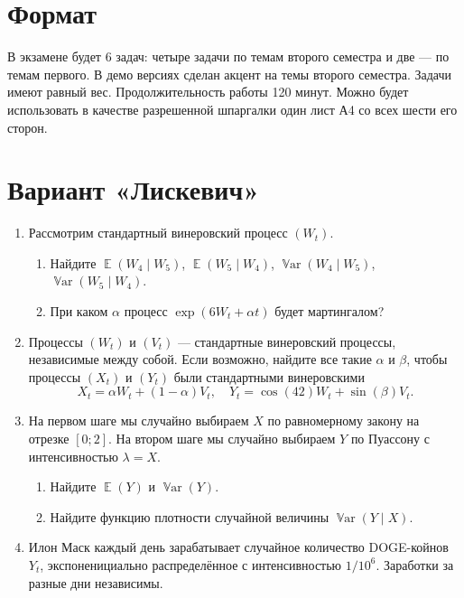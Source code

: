 \documentclass[12pt]{article}
\DeclareMathOperator{\Var}{\mathbb{V}ar}
\DeclareMathOperator{\E}{\mathbb{E}}
\begin{document}
\section*{Формат}

В экзамене будет 6 задач: четыре задачи по темам второго семестра и две — по темам первого. 
В демо версиях сделан акцент на темы второго семестра.
Задачи имеют равный вес. 
Продолжительность работы 120 минут. 
Можно будет использовать в качестве разрешенной шпаргалки один лист А4 со всех шести его сторон.


\section*{Вариант «Лискевич»}
\begin{enumerate}
    \item 
    Рассмотрим стандартный винеровский процесс $(W_t)$.
    \begin{enumerate}
        \item Найдите $\E(W_4 \mid W_5)$, $\E(W_5 \mid W_4)$, $\Var(W_4 \mid W_5)$, $\Var(W_5 \mid W_4)$.
        \item При каком $\alpha$ процесс $\exp(6W_t + \alpha t)$ будет мартингалом?
    \end{enumerate}
    
    
    \item Процессы $(W_t)$ и $(V_t)$ — стандартные винеровский процессы, независимые между собой. 
    Если возможно, найдите все такие $\alpha$ и $\beta$, чтобы процессы $(X_t)$ и $(Y_t)$ были
    стандартными винеровскими
    \[
    X_t = \alpha W_t + (1 - \alpha) V_t,  \quad Y_t = \cos(42) W_t + \sin (\beta) V_t.
    \]

    \item На первом шаге мы случайно выбираем $X$ по равномерному закону на отрезке $[0;2]$.
    На втором шаге мы случайно выбираем $Y$ по Пуассону с интенсивностью $\lambda = X$.
    \begin{enumerate}
        \item Найдите $\E(Y)$ и $\Var(Y)$.
        \item Найдите функцию плотности случайной величины $\Var(Y \mid X)$.
    \end{enumerate}

    \item Илон Маск каждый день зарабатывает случайное количество DOGE-койнов $Y_t$, экспоненициально распределённое с интенсивностью $1/10^6$.
    Заработки за разные дни независимы.
    

\end{enumerate}
\end{document}

